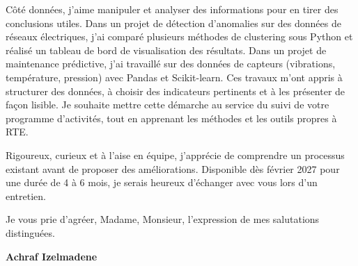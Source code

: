 \documentclass[10pt,a4paper]{altacv}
\begin{document}
\vspace{6pt}

Côté données, j'aime manipuler et analyser des informations pour en tirer des conclusions utiles. Dans un projet de détection d'anomalies sur des données de réseaux électriques, j'ai comparé plusieurs méthodes de clustering sous Python et réalisé un tableau de bord de visualisation des résultats. Dans un projet de maintenance prédictive, j'ai travaillé sur des données de capteurs (vibrations, température, pression) avec Pandas et Scikit-learn. Ces travaux m'ont appris à structurer des données, à choisir des indicateurs pertinents et à les présenter de façon lisible. Je souhaite mettre cette démarche au service du suivi de votre programme d'activités, tout en apprenant les méthodes et les outils propres à RTE.

\vspace{6pt}

Rigoureux, curieux et à l'aise en équipe, j'apprécie de comprendre un processus existant avant de proposer des améliorations. Disponible dès février 2027 pour une durée de 4 à 6 mois, je serais heureux d'échanger avec vous lors d'un entretien.

\vspace{6pt}

Je vous prie d'agréer, Madame, Monsieur, l'expression de mes salutations distinguées.

\vspace{14pt}

\begin{flushright}
  \large\color{emphasis}\textbf{Achraf Izelmadene}
\end{flushright}
\end{document}
